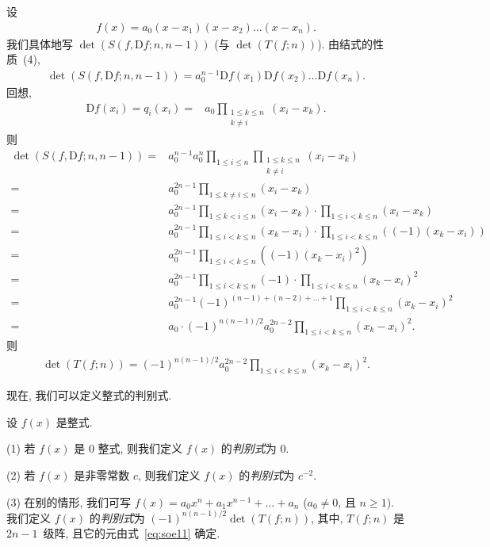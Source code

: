 \documentclass[../libro.tex]{subfiles}
\begin{document}
设
\begin{align*}
    f(x) = a_0 (x - x_1) (x - x_2) \dots (x - x_n).
\end{align*}
我们具体地写 \(\det {(S(f, \mathrm{D} f; n, n-1))}\)
(与 \(\det {(T(f; n))}\)).
由结式的性质~(4),
\begin{align*}
    \det {(S(f, \mathrm{D} f; n, n-1))}
    = a_0^{n-1}
    \mathrm{D} f(x_1) \mathrm{D} f(x_2)
    \dots \mathrm{D} f(x_n).
\end{align*}
回想,
\begin{align*}
    \mathrm{D} f(x_i) = q_i (x_i)
    = {} &
    a_0 \prod_{\substack{1 \leq k \leq n \\ k \neq i}} {(x_i - x_k)}.
\end{align*}
则
\begin{align*}
    \det {(S(f, \mathrm{D} f; n, n-1))}
    = {} & a_0^{n-1} a_0^n
    \prod_{1 \leq i \leq n}
    \prod_{\substack{1 \leq k \leq n \\ k \neq i}} {(x_i - x_k)}
    \\
    = {} &
    a_0^{2n-1}
    \prod_{1 \leq k \neq i \leq n} {(x_i - x_k)}
    \\
    = {} &
    a_0^{2n-1}
    \prod_{1 \leq k < i \leq n} {(x_i - x_k)}
    \cdot \prod_{1 \leq i < k \leq n} {(x_i - x_k)}
    \\
    = {} &
    a_0^{2n-1}
    \prod_{1 \leq i < k \leq n} {(x_k - x_i)}
    \cdot \prod_{1 \leq i < k \leq n} {((-1) (x_k - x_i))}
    \\
    = {} &
    a_0^{2n-1}
    \prod_{1 \leq i < k \leq n} {((-1) (x_k - x_i)^2)}
    \\
    = {} &
    a_0^{2n-1}
    \prod_{1 \leq i < k \leq n} {(-1)}
    \cdot \prod_{1 \leq i < k \leq n} {(x_k - x_i)^2}
    \\
    = {} &
    a_0^{2n-1} (-1)^{(n-1)+(n-2)+\dots+1}
    \prod_{1 \leq i < k \leq n} {(x_k - x_i)^2}
    \\
    = {} &
    a_0
    \cdot (-1)^{n(n-1)/2} a_0^{2n-2}
    \prod_{1 \leq i < k \leq n} {(x_k - x_i)^2}.
\end{align*}
则
\begin{align*}
    \det {(T(f; n))}
    = (-1)^{n(n-1)/2} a_0^{2n-2}
    \prod_{1 \leq i < k \leq n} {(x_k - x_i)^2}.
\end{align*}

现在, 我们可以定义整式的判别式.

\begin{definition}
    设 \(f(x)\) 是整式.

    (1)
    若 \(f(x)\) 是 \(0\) 整式,
    则我们定义 \(f(x)\) 的\emph{判别式}为 \(0\).

    (2)
    若 \(f(x)\) 是非零常数 \(c\),
    则我们定义 \(f(x)\) 的\emph{判别式}为 \(c^{-2}\).

    (3)
    在别的情形, 我们可写
    \(f(x) = a_0 x^n + a_1 x^{n-1} + \dots + a_n\)
    (\(a_0 \neq 0\), 且 \(n \geq 1\)).
    我们定义 \(f(x)\) 的\emph{判别式}为
    \((-1)^{n (n-1)/2} \det {(T(f; n))}\),
    其中, \(T(f; n)\) 是 \(2n-1\)~级阵,
    且它的元由式~\eqref{eq:soe11} 确定.
\end{definition}
\end{document}

